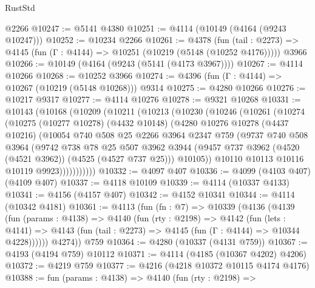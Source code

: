 \begin{lexlean}{RustStd}
\begin{coremodule}
{\begin{coremodule}
{{{{{{{{{{{{{{    @2266
@10247 := @5141 @4380
@10251 := @4114 (@10149 (@4164 (@9243 @10247)))
@10252 := @10234 @2266
@10261 := @4378
    (fun (tail : @2273) => @4145 (fun (Γ : @4144) => @10251 (@10219 (@5148 (@10252 @4176)))))
    @3966
@10266 := @10149 (@4164 (@9243 (@5141 (@4173 @3967))))
@10267 := @4114 @10266
@10268 := @10252 @3966
@10274 := @4396 (fun (Γ : @4144) => @10267 (@10219 (@5148 @10268))) @9314
@10275 := @4280 @10266
@10276 := @10217 @9317
@10277 := @4114 @10276
@10278 := @9321 @10268
@10331 := @10143
    (@10168
      (@10209
        (@10211
          (@10213
            (@10230
              (@10246
                (@10261
                  (@10274
                    (@10275
                      (@10277 @10278)
                      (@4432 @10148)
                      (@4280
                        @10276
                        @10278
                        (@4437 @10216)
                        (@10054
                          @740
                          @508
                          @25
                          @2266
                          @3964
                          @2347
                          @759
                          (@9737
                            @740
                            @508
                            @3964
                            (@9742
                              @738
                              @78
                              @25
                              @507
                              @3962
                              @3944
                              (@9457 @737 @3962 (@4520 (@4521 @3962)) (@4525 (@4527 @737 @25)))
                              @10105))
                          @10110
                          @10113
                          @10116
                          @10119
                          @9923)))))))))))
@10332 := @4097 @407
@10336 := @4099 (@4103 @407) (@4109 @407)
@10337 := @4118 @10109
@10339 := @4114 (@10337 @4133)
@10341 := @4156 (@4157 @407)
@10342 := @4152 @10341
@10344 := @4114 (@10342 @4181)
@10361 := @4113
    (fun (fn : @7) =>
    @10339
      (@4136
        (@4139
          (fun (params : @4138) =>
          @4140
            (fun (rty : @2198) =>
            @4142
              (fun (lets : @4141) =>
              @4143 (fun (tail : @2273) => @4145 (fun (Γ : @4144) => @10344 @4228))))))
        @4274))
    @759
@10364 := @4280 (@10337 (@4131 @759))
@10367 := @4193 (@4194 @759) @10112
@10371 := @4114 (@4185 (@10367 @4202) @4206)
@10372 := @4219 @759
@10377 := @4216 (@4218 @10372 @10115 @4174 @4176)
@10388 := fun (params : @4138) =>
  @4140
    (fun (rty : @2198) =>
}}}}}}}}}}}}}}
\end{coremodule}}
\end{coremodule}
\end{lexlean}
